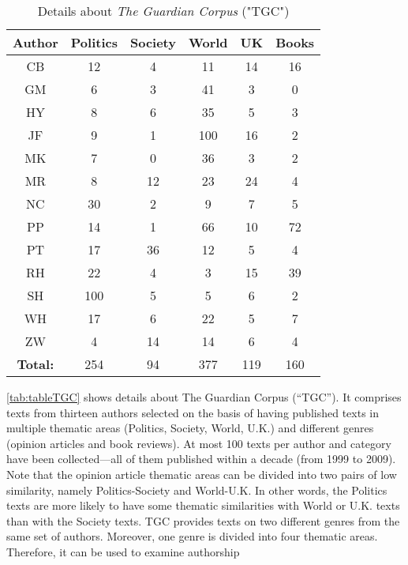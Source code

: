 \begin{table}[h!]
	\begin{center}  
		\caption[The Guardian Corpus]{Details about \textit{The Guardian Corpus} ("TGC")} 
		\label{tab:tableTGC}
		\begin{tabular}{|c | c | c | c | c | c |}
			\hline 
			Author & Politics & Society & World & UK & Books \\
			\hline \hline
			CB & 12 & 4 & 11 & 14 & 16 \\ \hline
			GM & 6 & 3 & 41 & 3 & 0 \\ \hline
			HY & 8 & 6 & 35 & 5 & 3 \\ \hline
			JF & 9 & 1 & 100 & 16 & 2 \\ \hline
			MK & 7 & 0 & 36 & 3 & 2 \\ \hline
			MR & 8 & 12 & 23 & 24 & 4 \\ \hline
			NC & 30 & 2 & 9 & 7 & 5 \\ \hline
			PP & 14 & 1 & 66 & 10 & 72 \\ \hline
			PT & 17 & 36 & 12 & 5 & 4 \\ \hline
			RH & 22 & 4 & 3 & 15 & 39 \\ \hline
			SH & 100 & 5 & 5 & 6 & 2 \\ \hline
			WH & 17 & 6 & 22 & 5 & 7 \\ \hline
			ZW & 4 & 14 & 14 & 6 & 4 \\ \hline
			\textbf{Total:} & 254 & 94 & 377 & 119 & 160 \\ \hline
		\end{tabular} 
	\end{center}
\end{table}
\autoref{tab:tableTGC} shows details about The Guardian Corpus (“TGC”). It comprises texts from thirteen authors selected on the basis of having published texts in multiple thematic areas (Politics,
Society, World, U.K.) and different genres (opinion articles and book reviews). At most 100 texts per author and category have been collected—all of them published within a decade (from
1999 to 2009). Note that the opinion article thematic areas can be divided into two pairs of low similarity, namely Politics-Society and World-U.K. In other words, the Politics texts are more likely to have some thematic similarities with World or U.K. texts than with the Society texts.
TGC provides texts on two different genres from the same set of authors. Moreover, one genre is divided into four thematic areas. Therefore, it can be used to examine authorship
